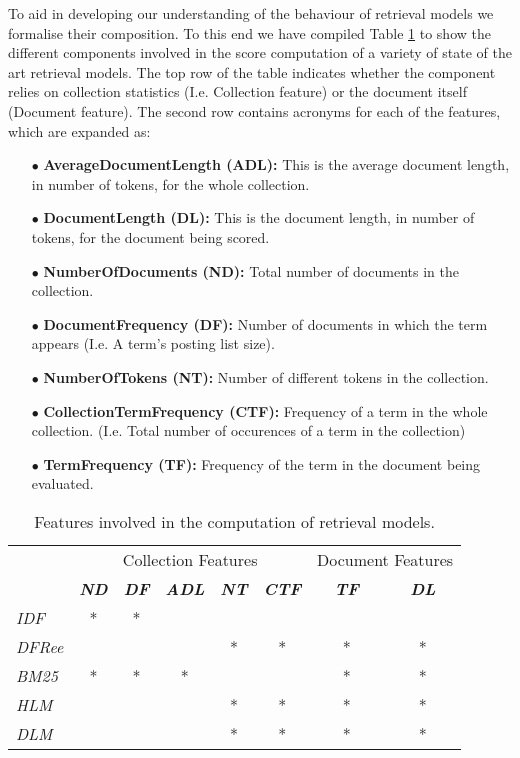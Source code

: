 To aid in developing our understanding of the behaviour of retrieval models we formalise their composition. To this end we have compiled Table \ref{modelfeatures} to show the different components involved in the score computation of a variety of state of the art retrieval models. The top row of the table indicates whether the component relies on collection statistics (I.e. Collection feature) or the document itself (Document feature). The second row contains acronyms for each of the features, which are expanded as: 

\begin{itemize}
\item [$\bullet$] \textbf{AverageDocumentLength (ADL):} This is the average document length, in number of tokens, for the whole collection.
\item [$\bullet$] \textbf{DocumentLength (DL):} This is the document length, in number of tokens, for the document being scored.
\item [$\bullet$] \textbf{NumberOfDocuments (ND):} Total number of documents in the collection. 
\item [$\bullet$] \textbf{DocumentFrequency (DF):} Number of documents in which the term appears (I.e. A term's posting list size).
\item [$\bullet$] \textbf{NumberOfTokens (NT):} Number of different tokens in the collection.
\item [$\bullet$] \textbf{CollectionTermFrequency (CTF):} Frequency of a term in the whole collection. (I.e. Total number of occurences of a term in the collection)
\item [$\bullet$] \textbf{TermFrequency (TF):} Frequency of the term in the document being evaluated.
\end{itemize}

\begin{table}[]
	\caption{Features involved in the computation of retrieval models.}
	\centering
	\begin{tabular}{|l|c|c|c|c|c||c|c|} 
		\cline{2- 8}
		\multicolumn{1}{c|}{}& \multicolumn{5}{c||}{Collection Features} &  \multicolumn{2}{c|}{Document Features} \tabularnewline
		\cline{2- 8}
		\multicolumn{1}{c|}{}
		& \textit{\textbf{ND} } & \textit{\textbf{DF} } & \textit{\textbf{ADL} } & \textit{\textbf{NT} } 
		& \textit{\textbf{CTF} } & \textit{\textbf{TF} } & \textit{\textbf{DL} } \tabularnewline \hline
		\textit{IDF} 	& * &  *&  	&   &  	&	&   \tabularnewline \hline
		\textit{DFRee} 	&   &   &   & * & * &*	&* \tabularnewline \hline
		\textit{BM25}	& * &  *& * &   &  	&*	&* \tabularnewline \hline
		\textit{HLM} 	&   &   &  	& * & * &*	&* \tabularnewline \hline
		\textit{DLM} 	&   &   &  	& * & * &*	&* \tabularnewline \hline
	\end{tabular}
	\label{modelfeatures}
\end{table}

